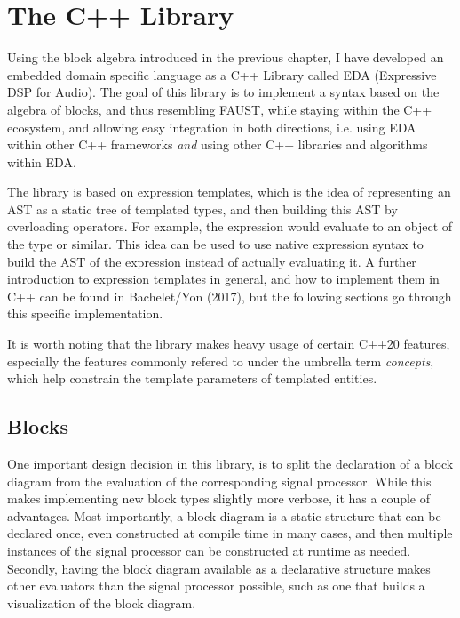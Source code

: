 \chapter{The C++ Library}
\label{chap:cpp_lib}

% 

Using the block algebra introduced in the previous chapter, I have developed an embedded domain specific
language as a C++ Library called EDA (Expressive DSP for Audio). The goal of this library is to implement a
syntax based on the algebra of blocks, and thus resembling FAUST, while staying within the C++ ecosystem, and
allowing easy integration in both directions, i.e. using EDA within other C++ frameworks
\emph{and} using other C++ libraries and algorithms within EDA.

The library is based on expression templates\autocite{bachelet}, which is the idea of representing an AST
as a static tree of templated types, and then building this AST by overloading operators. For example, the
expression
 would evaluate to an object of the type  or similar. This idea can
be used to use native expression syntax to build the AST of the expression instead of actually evaluating it.
A further introduction to expression templates in general, and how to implement them in C++ can be found in
Bachelet/Yon (2017)\autocite{bachelet}, but the following sections go through this specific
implementation.

It is worth noting that the library makes heavy usage of certain C++20\autocite{C++Std} features,
especially the features commonly refered to under the umbrella term
\emph{concepts}\autocite{cppr:concepts}, which help constrain the template parameters of templated
entities.

\section{Blocks}

One important design decision in this library, is to split the declaration of a block diagram from the
evaluation of the corresponding signal processor. While this makes implementing new block types slightly more
verbose, it has a couple of advantages. Most importantly, a block diagram is a static structure that can be
declared once, even constructed at compile time in many cases, and then multiple instances of the signal
processor can be constructed at runtime as needed. Secondly, having the block diagram available as a
declarative structure makes other evaluators than the signal processor possible, such as one that builds a
visualization of the block diagram.

